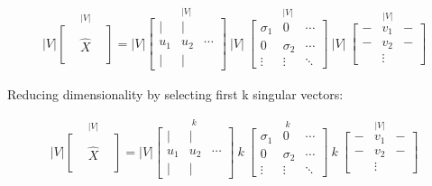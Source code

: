 \begin{equation}
\begin{gathered}
\left| V \right| 
\overset{\left| V \right|}{
\left[
    \begin{array}{ccc}
        &   &   \\
        & \hat{X} &   \\
        &   &  
    \end{array}
\right]
}
=
\left| V \right|
\overset{\left| V \right|}{
\left[
    \begin{array}{ccc}
        \mid  & \mid &   \\
        u_1   & u_2  & \cdots  \\
        \mid  & \mid &  
    \end{array}
\right]
}
\ \left| V \right| \ 
\overset{\left| V \right|}{
\left[
    \begin{array}{ccc}
        \sigma_1 & 0        & \cdots \\
        0        & \sigma_2 & \cdots \\
        \vdots   & \vdots   & \ddots
    \end{array}
\right]
}
\ \left| V \right| \ 
\overset{\left| V \right|}{
\left[
    \begin{array}{ccc}
        - & v_1 & - \\
        - & v_2 & - \\
            & \vdots &  
    \end{array}
\right]
}
\end{gathered}
\end{equation}

Reducing dimensionality by selecting first k singular vectors:

\begin{equation}
\begin{gathered}
\left| V \right| 
\overset{\left| V \right|}{
\left[
    \begin{array}{ccc}
        &   &   \\
        & \hat{X} &   \\
        &   &  
    \end{array}
\right]
}
=
\left| V \right|
\overset{k}{
\left[
    \begin{array}{ccc}
        \mid  & \mid &   \\
        u_1   & u_2  & \cdots  \\
        \mid  & \mid &  
    \end{array}
\right]
}
\ k \ 
\overset{k}{
\left[
    \begin{array}{ccc}
        \sigma_1 & 0        & \cdots \\
        0        & \sigma_2 & \cdots \\
        \vdots   & \vdots   & \ddots
    \end{array}
\right]
}
\ k \ 
\overset{\left| V \right|}{
\left[
    \begin{array}{ccc}
        - & v_1 & - \\
        - & v_2 & - \\
            & \vdots &  
    \end{array}
\right]
}
\end{gathered}
\end{equation}

